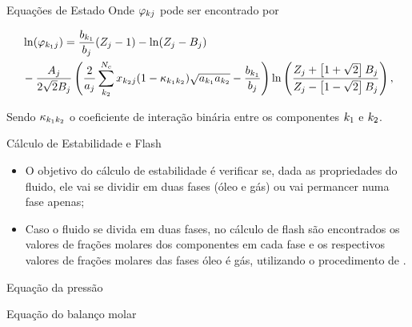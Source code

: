 \documentclass[professionalfont]{beamer}
\begin{document}
\begin{frame}{Equações de Estado}
    \small
    Onde $\varphi_{k j}$ pode ser encontrado por

    \begin{equation}
        \label{eq:eos.10}
        \begin{aligned}
            &\ln (\varphi_{k_{1} j}) = \dfrac{b_{k_{1}}}{b_{j}} (Z_{j} - 1) - \ln (Z_{j} - B_{j})\\
            &- \dfrac{A_{j}}{2\sqrt{2} B_{j}} \left(\dfrac{2}{a_{j}} \sum_{k_{2}}^{N_{c}} x_{k_{2} j}(1 - \kappa_{k_{1} k_{2}})\sqrt{a_{k_{1}} a_{k_{2}}} - \dfrac{b_{k_{1}}}{b_{j}} \right) \ln \left(\dfrac{Z_{j} + \left[1 + \sqrt{2} \right] B_{j}}{Z_{j} - \left[1 - \sqrt{2} \right] B_{j}} \right),
        \end{aligned}
    \end{equation}

    Sendo $\kappa_{k_{1} k_{2}}$ o coeficiente de interação binária entre os componentes $k_{1}$ e $k_{2}$.

\end{frame}

\begin{frame}{Cálculo de Estabilidade e Flash}

    \begin{itemize}
        \item O objetivo do cálculo de estabilidade é verificar se, dada as propriedades do fluido, ele vai se dividir em duas fases (óleo e gás) ou vai permancer numa fase apenas;
        \item Caso o fluido se divida em duas fases, no cálculo de flash são encontrados os valores de frações molares dos componentes em cada fase e os respectivos valores de frações molares das fases óleo é gás, utilizando o procedimento de .
    \end{itemize} 
    
\end{frame}

\begin{frame}{Equação da pressão}
    
\end{frame}

\begin{frame}{Equação do balanço molar}
    
\end{frame}
\end{document}
